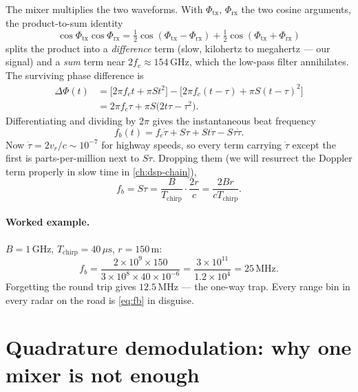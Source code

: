 \documentclass[11pt,oneside]{book}
\begin{document}
The mixer multiplies the two waveforms. With $\Phi_{\mathrm{tx}}$,
$\Phi_{\mathrm{rx}}$ the two cosine arguments, the product-to-sum identity
\begin{equation}
\cos\Phi_{\mathrm{tx}}\cos\Phi_{\mathrm{rx}}
= \tfrac12\cos(\Phi_{\mathrm{tx}}-\Phi_{\mathrm{rx}})
+ \tfrac12\cos(\Phi_{\mathrm{tx}}+\Phi_{\mathrm{rx}})
\label{eq:prod2sum}
\end{equation}
splits the product into a \emph{difference} term (slow, kilohertz to
megahertz --- our signal) and a \emph{sum} term near $2f_c\approx
154\,\mathrm{GHz}$, which the low-pass filter annihilates. The surviving
phase difference is
\begin{align}
\Delta\Phi(t) &= \big[2\pi f_c t+\pi S t^2\big]
                 -\big[2\pi f_c(t-\tau)+\pi S(t-\tau)^2\big] \nonumber\\
&= 2\pi f_c\tau + \pi S\big(2t\tau-\tau^2\big).
\label{eq:dphi}
\end{align}
Differentiating and dividing by $2\pi$ gives the instantaneous beat
frequency
\begin{equation}
f_b(t) = f_c\dot\tau + S\tau + St\dot\tau - S\tau\dot\tau.
\label{eq:fb-full}
\end{equation}
Now $\dot\tau = 2v_r/c\sim 10^{-7}$ for highway speeds, so every term
carrying $\dot\tau$ except the first is parts-per-million next to $S\tau$.
Dropping them (we will resurrect the Doppler term properly in slow time in
\cref{ch:dsp-chain}),
\begin{equation}
\boxed{f_b = S\tau = \frac{B}{T_{\mathrm{chirp}}}\cdot\frac{2r}{c}
      = \frac{2Br}{cT_{\mathrm{chirp}}}.}
\label{eq:fb}
\end{equation}
\paragraph{Worked example.} $B=1\,\mathrm{GHz}$,
$T_{\mathrm{chirp}}=40\,\mu\mathrm{s}$, $r=150\,\mathrm{m}$:
\begin{equation}
f_b = \frac{2\times10^{9}\times150}{3\times10^{8}\times40\times10^{-6}}
    = \frac{3\times10^{11}}{1.2\times10^{4}}
    = 25\,\mathrm{MHz}.
\label{eq:fb-example}
\end{equation}
Forgetting the round trip gives $12.5\,\mathrm{MHz}$ --- the one-way trap.
Every range bin in every radar on the road is \cref{eq:fb} in disguise.

\section{Quadrature demodulation: why one mixer is not enough}
\label{sec:iq}
\end{document}
